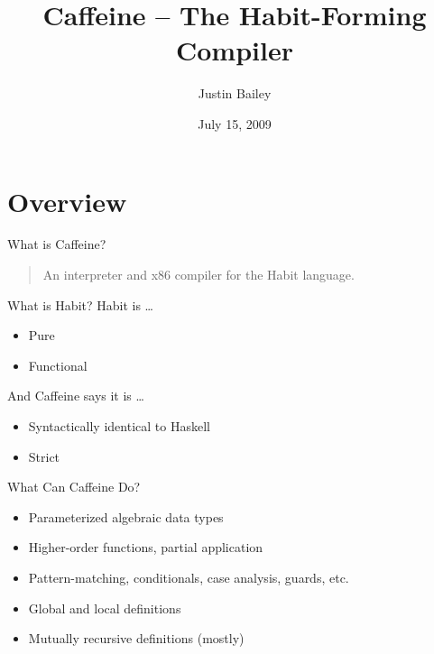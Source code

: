 \documentclass{beamer}
\title{Caffeine -- The Habit-Forming Compiler}
\author{Justin Bailey}
\date{July 15, 2009}
\begin{document}
\VerbatimFootnotes
\DefineShortVerb{\#}

\begin{frame}
\titlepage
\end{frame}

\section{Overview}

\begin{frame}{What is Caffeine?}
  \begin{quote}
    An interpreter and x86 compiler for the Habit language.
  \end{quote}
\end{frame}

\begin{frame}{What is Habit?}
  Habit is \ldots
  \begin{itemize}
  \item Pure
  \item Functional
  \end{itemize}

  And Caffeine says it is \ldots
  \begin{itemize}
  \item Syntactically identical to Haskell
  \item Strict 
  \end{itemize}
\end{frame}

\begin{frame}{What Can Caffeine Do?}
  \begin{itemize}
  \item Parameterized algebraic data types
  \item Higher-order functions, partial application
  \item Pattern-matching, conditionals, case analysis, guards, etc.
  \item Global and local definitions
  \item Mutually recursive definitions (mostly)
  \end{itemize}
\end{frame}

\end{document}

